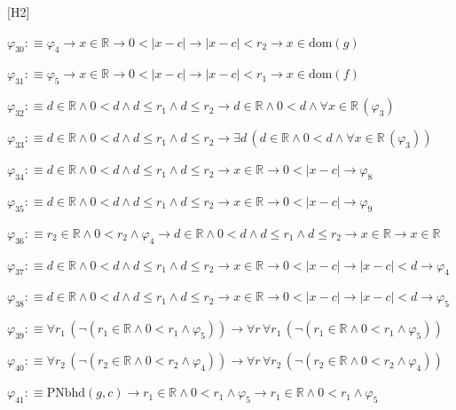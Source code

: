 \begin{fullproof}{[H2]}
\begin{abbrevlist}
\item $\varphi_{30} :\equiv \varphi_{4} \to x \in \mathbb{R} \to 0 < \lvert x - c \rvert \to \lvert x - c \rvert < r_{2} \to x \in \mathrm{dom}(g)$
\item $\varphi_{31} :\equiv \varphi_{5} \to x \in \mathbb{R} \to 0 < \lvert x - c \rvert \to \lvert x - c \rvert < r_{1} \to x \in \mathrm{dom}(f)$
\item $\varphi_{32} :\equiv d \in \mathbb{R} \land 0 < d \land d \leq r_{1} \land d \leq r_{2} \to d \in \mathbb{R} \land 0 < d \land \forall x \in \mathbb{R}\,(\varphi_{3})$
\item $\varphi_{33} :\equiv d \in \mathbb{R} \land 0 < d \land d \leq r_{1} \land d \leq r_{2} \to \exists d\,(d \in \mathbb{R} \land 0 < d \land \forall x \in \mathbb{R}\,(\varphi_{3}))$
\item $\varphi_{34} :\equiv d \in \mathbb{R} \land 0 < d \land d \leq r_{1} \land d \leq r_{2} \to x \in \mathbb{R} \to 0 < \lvert x - c \rvert \to \varphi_{8}$
\item $\varphi_{35} :\equiv d \in \mathbb{R} \land 0 < d \land d \leq r_{1} \land d \leq r_{2} \to x \in \mathbb{R} \to 0 < \lvert x - c \rvert \to \varphi_{9}$
\item $\varphi_{36} :\equiv r_{2} \in \mathbb{R} \land 0 < r_{2} \land \varphi_{4} \to d \in \mathbb{R} \land 0 < d \land d \leq r_{1} \land d \leq r_{2} \to x \in \mathbb{R} \to x \in \mathbb{R}$
\item $\varphi_{37} :\equiv d \in \mathbb{R} \land 0 < d \land d \leq r_{1} \land d \leq r_{2} \to x \in \mathbb{R} \to 0 < \lvert x - c \rvert \to \lvert x - c \rvert < d \to \varphi_{4}$
\item $\varphi_{38} :\equiv d \in \mathbb{R} \land 0 < d \land d \leq r_{1} \land d \leq r_{2} \to x \in \mathbb{R} \to 0 < \lvert x - c \rvert \to \lvert x - c \rvert < d \to \varphi_{5}$
\item $\varphi_{39} :\equiv \forall r_{1}\,(\neg (r_{1} \in \mathbb{R} \land 0 < r_{1} \land \varphi_{5})) \to \forall r\,\forall r_{1}\,(\neg (r_{1} \in \mathbb{R} \land 0 < r_{1} \land \varphi_{5}))$
\item $\varphi_{40} :\equiv \forall r_{2}\,(\neg (r_{2} \in \mathbb{R} \land 0 < r_{2} \land \varphi_{4})) \to \forall r\,\forall r_{2}\,(\neg (r_{2} \in \mathbb{R} \land 0 < r_{2} \land \varphi_{4}))$
\item $\varphi_{41} :\equiv \mathrm{PNbhd}(g,c) \to r_{1} \in \mathbb{R} \land 0 < r_{1} \land \varphi_{5} \to r_{1} \in \mathbb{R} \land 0 < r_{1} \land \varphi_{5}$

\end{abbrevlist}
\end{fullproof}
